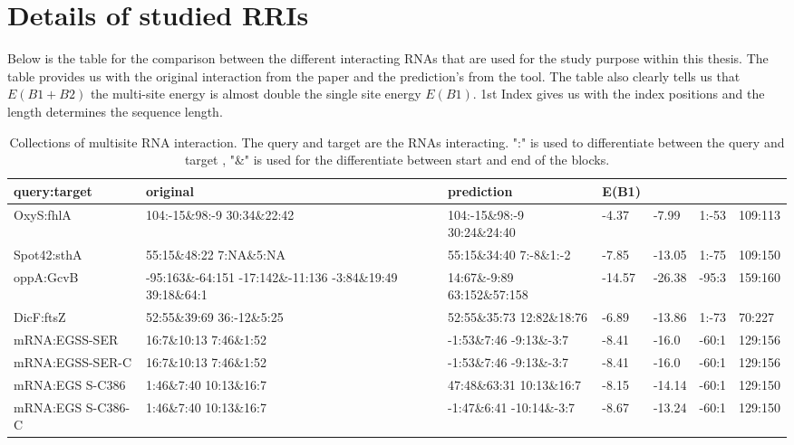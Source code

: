 \documentclass[twoside,a4paper]{report}
\numberwithin{equation}{section}
\begin{document}
\section{Details of studied RRIs}

Below is the table for the comparison between the different interacting RNAs that are used for the study purpose within this thesis. The table provides us with the original interaction from the paper and the prediction's from the tool. The table also clearly tells us that $E(B1+ B2)$ the multi-site energy is almost double the single site energy $E(B1)$. 1st Index gives us with the index positions and the length determines the sequence length.\\
	
\begin{table}[H]
	

	\begin{tabular}{ |p{2cm}|p{2.8cm}|p{2.8cm}|p{1cm}|p{1cm}|p{1cm}|p{1cm}|}
	
		\hline
		query:target& original& prediction& \rotatebox[origin=c]{90} {E(B1)}  &\rotatebox[origin=c]{90}{E(B1+B2)}  &\rotatebox[origin=c]{90}{1st index}  &\rotatebox[origin=c]{90}{length} \\
		\hline
		\hline
		OxyS:fhlA&104:-15\&98:-9 30:34\&22:42
		&104:-15\&98:-9 30:24\&24:40&-4.37 &-7.99 &1:-53&109:113\\
		\hline
		Spot42:sthA&55:15\&48:22  7:NA\&5:NA & 55:15\&34:40 7:-8\&1:-2
		& -7.85 &-13.05 & 1:-75 &109:150 \\
		\hline
		oppA:GcvB &-95:163\&-64:151 -17:142\&-11:136 -3:84\&19:49 39:18\&64:1  &14:67\&-9:89 63:152\&57:158
		
		& -14.57 &-26.38 & -95:3 &159:160\\
		\hline
		DicF:ftsZ&52:55\&39:69   \hbox{36:-12\&5:25}  &52:55\&35:73 12:82\&18:76	& -6.89 &-13.86 &1:-73 &70:227 \\
		\hline
		mRNA:EGSS-SER &16:7\&10:13 7:46\&1:52
		  &-1:53\&7:46 \hbox{-9:13\&-3:7}
		 & -8.41 &-16.0 & -60:1 &129:156 \\
		\hline
		mRNA:EGSS-SER-C &16:7\&10:13 7:46\&1:52
		  &-1:53\&7:46 \hbox{-9:13\&-3:7}
		 & -8.41 &-16.0 & -60:1 &129:156 \\
		\hline
		mRNA:EGS S-C386 &1:46\&7:40 10:13\&16:7 &
		47:48\&63:31 10:13\&16:7
		  & -8.15&-14.14 & -60:1 &129:150 \\
		\hline
		mRNA:EGS S-C386-C &1:46\&7:40 10:13\&16:7
		 &-1:47\&6:41 \hbox{-10:14\&-3:7}
		  & -8.67 &-13.24 & -60:1 &129:150 \\
		\hline
	\end{tabular}
	\caption{Collections of multisite RNA interaction. The query and target are the RNAs interacting. ":" is used to differentiate between the query and target , "\&" is used for the differentiate between start and end of the blocks.  }	
		\label{table:2}
\end{table}
\end{document}
